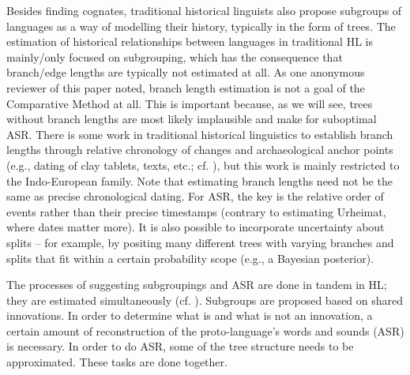 \documentclass[12pt,letterpaper]{article}
\begin{document}



Besides finding cognates, traditional historical linguists also propose subgroups of languages as a way of modelling their history, typically in the form of trees. The estimation of historical relationships between languages in traditional HL is mainly/only focused on subgrouping, which has the consequence that branch/edge lengths are typically not estimated at all. As one anonymous reviewer of this paper noted, branch length estimation is not a goal of the Comparative Method at all. This is important because, as we will see, trees without branch lengths are most likely implausible and make for suboptimal ASR. There is some work in traditional historical linguistics to establish branch lengths through relative chronology of changes and archaeological anchor points (e.g., dating of clay tablets, texts, etc.; cf. \citealt{pereltsvaig2015indo_dates}), but this work is mainly restricted to the Indo-European family. Note that estimating branch lengths need not be the same as precise chronological dating. For ASR, the key is the relative order of events rather than their precise timestamps (contrary to estimating Urheimat, where dates matter more). It is also possible to incorporate uncertainty about splits -- for example, by positing many different trees with varying branches and splits that fit within a certain probability scope (e.g., a Bayesian posterior).

The processes of suggesting subgroupings and ASR are done in tandem in HL; they are estimated simultaneously (cf. \citealt[7]{protooceanicvol1}). Subgroups are proposed based on shared innovations. In order to determine what is and what is not an innovation, a certain amount of reconstruction of the proto-language's words and sounds (ASR) is necessary. In order to do ASR, some of the tree structure needs to be approximated. These tasks are done together.
\end{document}
